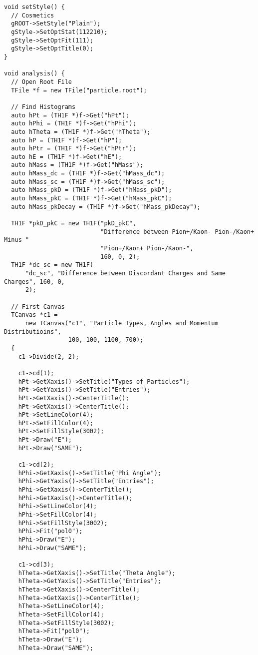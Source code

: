 \begin{lstlisting}
void setStyle() {
  // Cosmetics
  gROOT->SetStyle("Plain");
  gStyle->SetOptStat(112210);
  gStyle->SetOptFit(111);
  gStyle->SetOptTitle(0);
}

void analysis() {
  // Open Root File
  TFile *f = new TFile("particle.root");

  // Find Histograms
  auto hPt = (TH1F *)f->Get("hPt");
  auto hPhi = (TH1F *)f->Get("hPhi");
  auto hTheta = (TH1F *)f->Get("hTheta");
  auto hP = (TH1F *)f->Get("hP");
  auto hPtr = (TH1F *)f->Get("hPtr");
  auto hE = (TH1F *)f->Get("hE");
  auto hMass = (TH1F *)f->Get("hMass");
  auto hMass_dc = (TH1F *)f->Get("hMass_dc");
  auto hMass_sc = (TH1F *)f->Get("hMass_sc");
  auto hMass_pkD = (TH1F *)f->Get("hMass_pkD");
  auto hMass_pkC = (TH1F *)f->Get("hMass_pkC");
  auto hMass_pkDecay = (TH1F *)f->Get("hMass_pkDecay");

  TH1F *pkD_pkC = new TH1F("pkD_pkC",
                           "Difference between Pion+/Kaon- Pion-/Kaon+ Minus "
                           "Pion+/Kaon+ Pion-/Kaon-",
                           160, 0, 2);
  TH1F *dc_sc = new TH1F(
      "dc_sc", "Difference between Discordant Charges and Same Charges", 160, 0,
      2);

  // First Canvas
  TCanvas *c1 =
      new TCanvas("c1", "Particle Types, Angles and Momentum Distributioins",
                  100, 100, 1100, 700);
  {
    c1->Divide(2, 2);

    c1->cd(1);
    hPt->GetXaxis()->SetTitle("Types of Particles");
    hPt->GetYaxis()->SetTitle("Entries");
    hPt->GetXaxis()->CenterTitle();
    hPt->GetXaxis()->CenterTitle();
    hPt->SetLineColor(4);
    hPt->SetFillColor(4);
    hPt->SetFillStyle(3002);
    hPt->Draw("E");
    hPt->Draw("SAME");

    c1->cd(2);
    hPhi->GetXaxis()->SetTitle("Phi Angle");
    hPhi->GetYaxis()->SetTitle("Entries");
    hPhi->GetXaxis()->CenterTitle();
    hPhi->GetXaxis()->CenterTitle();
    hPhi->SetLineColor(4);
    hPhi->SetFillColor(4);
    hPhi->SetFillStyle(3002);
    hPhi->Fit("pol0");
    hPhi->Draw("E");
    hPhi->Draw("SAME");

    c1->cd(3);
    hTheta->GetXaxis()->SetTitle("Theta Angle");
    hTheta->GetYaxis()->SetTitle("Entries");
    hTheta->GetXaxis()->CenterTitle();
    hTheta->GetXaxis()->CenterTitle();
    hTheta->SetLineColor(4);
    hTheta->SetFillColor(4);
    hTheta->SetFillStyle(3002);
    hTheta->Fit("pol0");
    hTheta->Draw("E");
    hTheta->Draw("SAME");


\end{lstlisting}
